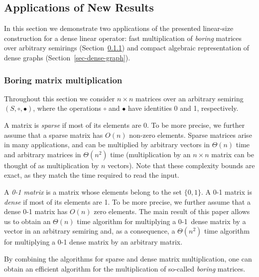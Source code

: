 \documentclass[11pt,letterpaper]{article}
\begin{document}
\subsection{Applications of New Results}
In this section we demonstrate two applications of the presented linear-size
construction for a dense linear operator: fast multiplication of \emph{boring}
matrices over arbitrary semirings (Section~\ref{sec-boring-matrices}) and
compact algebraic representation of dense graphs
(Section~\ref{sec-dense-graph}).

\subsubsection{Boring matrix multiplication}\label{sec-boring-matrices}

Throughout this section we consider $n \times n$ matrices over an arbitrary
semiring $(S, \circ, \bullet)$, where the operations $\circ$ and $\bullet$ have
identities 0 and 1, respectively.

A matrix is \emph{sparse} if most of its elements are 0. To be more precise, we
further assume that a sparse matrix has $O(n)$ non-zero elements. Sparse
matrices arise in many applications, and can be multiplied by arbitrary vectors
in $\Theta(n)$ time and arbitrary matrices in $\Theta(n^2)$ time (multiplication
by an $n\times n$ matrix can be thought of as multiplication by $n$ vectors).
Note that these complexity bounds are exact, as they match the time required to
read the input.

A \emph{0-1 matrix} is a matrix whose elements belong to the set $\{0,1\}$. A
0-1 matrix is \emph{dense} if most of its elements are 1. To be more precise, we
further assume that a dense 0-1 matrix has $O(n)$ zero elements. The main result
of this paper allows us to obtain an $\Theta(n)$ time algorithm for multiplying
a 0-1~dense matrix by a vector in an arbitrary semiring and, as a consequence, a
$\Theta(n^2)$ time algorithm for multiplying a 0-1 dense matrix by an arbitrary
matrix.


By combining the algorithms for sparse and dense matrix multiplication, one can
obtain an efficient algorithm for the multiplication of so-called \emph{boring}
matrices.
\end{document}
